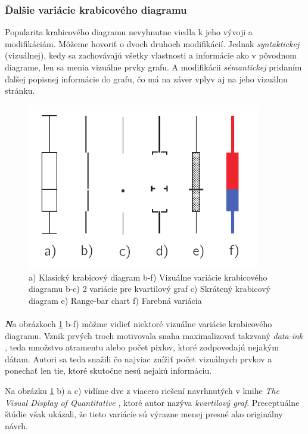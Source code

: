 \subsubsection{Ďalšie variácie krabicového diagramu}

Popularita krabicového diagramu nevyhnutne viedla k jeho vývoji a modifikáciám. Môžeme hovoriť o dvoch druhoch modifikácií. Jednak \textit{syntaktickej} (vizuálnej), kedy sa zachovávajú všetky vlastnosti a informácie ako v pôvodnom diagrame, len sa menia vizuálne prvky grafu. A modifikácii \textit{sémantickej} pridaním ďalšej popisnej informácie do grafu, čo má na záver vplyv aj na jeho vizuálnu stránku.


\begin{figure}
	\centering
	\includegraphics[width = 4in]{boxplot2}
	\caption{ a) Klasický krabicový diagram  b-f) Vizuálne variácie krabicového diagramu b-c) 2 variácie pre kvartilový graf \cite{Tufte83} c) Skrátený krabicový diagram \cite{VisualSummaryPotter} e) Range-bar chart \cite{Spear} f) Farebná variácia \cite{Carr}  }
	\label{fig:boxplotmodif1}
\end{figure}


\paragraph{}
{\large \textbf{\textit{N}}}a obrázkoch \ref{fig:boxplotmodif1} b-f) môžme vidieť niektoré vizuálne variácie krabicového diagramu. Vznik prvých troch motivovala snaha maximalizovať takzvaný \textit{data-ink} \cite{Tufte83}, teda množstvo atramentu alebo počet pixlov, ktoré zodpovedajú nejakým dátam. Autori sa teda snažili čo najviac znížiť počet vizuálnych prvkov a ponechať len tie, ktoré skutočne nesú nejakú informáciu. 

Na obrázku \ref{fig:boxplotmodif1} b) a c) vidíme dve z viacero riešení navrhnutých v knihe \textit{The Visual Display of Quantitative} \cite{Tufte83}, ktoré autor nazýva \textit{kvartilový graf}. Preceptuálne štúdie \cite{Stock} však ukázali, že tieto variácie sú výrazne menej presné ako originálny návrh.

